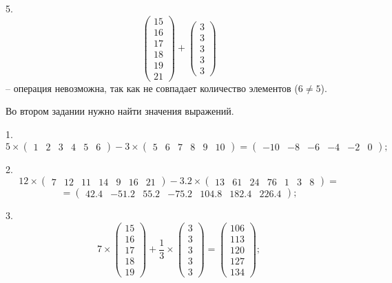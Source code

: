 \documentclass[14pt,a4paper]{extarticle}
\begin{document}
5. \[\begin{pmatrix} 15 \\ 16 \\ 17 \\ 18 \\ 19 \\ 21 \end{pmatrix} + \begin{pmatrix} 3 \\ 3 \\ 3 \\ 3 \\ 3 \end{pmatrix}\]
-- операция невозможна, так как не совпадает количество элементов ($6 \neq 5$).

Во втором задании нужно найти значения выражений.

1. \[5\times\begin{pmatrix} 1 & 2 & 3 & 4 & 5 & 6 \end{pmatrix}-3\times\begin{pmatrix} 5 & 6 & 7 & 8 & 9 & 10 \end{pmatrix} = \begin{pmatrix} -10 & -8 & -6 & -4 & -2 & 0 \end{pmatrix};\]

2. \[12\times\begin{pmatrix} 7 & 12 & 11 & 14 & 9 & 16 & 21 \end{pmatrix}-3.2\times\begin{pmatrix} 13 & 61 & 24 & 76 & 1 & 3 & 8 \end{pmatrix} =\]
\[=\begin{pmatrix} 42.4 & -51.2 & 55.2 & -75.2 & 104.8 & 182.4 & 226.4 \end{pmatrix};\]

3. \[7\times\begin{pmatrix} 15 \\ 16 \\ 17 \\ 18 \\ 19 \end{pmatrix}+\frac{1}{3}\times\begin{pmatrix} 3 \\ 3 \\ 3 \\ 3 \\ 3 \end{pmatrix}
=\begin{pmatrix} 106 \\ 113 \\ 120 \\ 127 \\ 134 \end{pmatrix};\]
\end{document}

